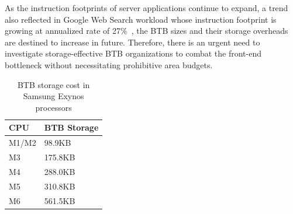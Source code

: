 As the instruction footprints of server applications continue to expand, a trend also reflected in Google Web Search workload whose instruction footprint is growing at annualized rate of 27\%~\cite{profileWarehouse}, the BTB sizes and their storage overheads are destined to increase in future. Therefore, there is an urgent need to investigate storage-effective BTB organizations to combat the front-end bottleneck without necessitating prohibitive area budgets.

\begin{table}[t]
  \centering
  \caption{\label{hpca:tab:btbcap} BTB storage cost in Samsung Exynos processors}
  \begin{tabular}{ll}\hline
    \textbf{CPU} & \textbf{BTB Storage} \\\hline
    M1/M2 & 98.9KB \\
    M3 & 175.8KB \\
    M4 & 288.0KB \\
    M5 & 310.8KB \\
    M6 & 561.5KB \\\hline
  \end{tabular}
\end{table}






